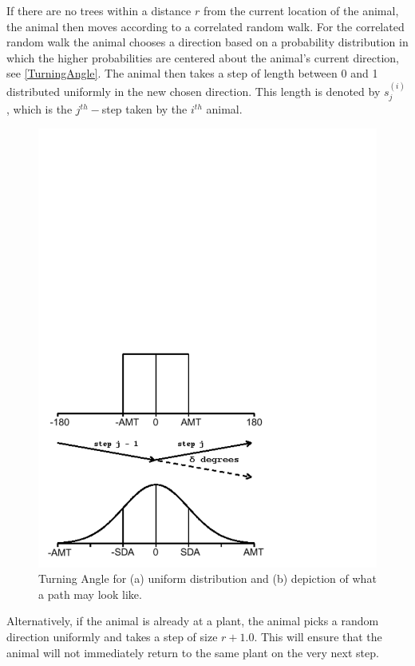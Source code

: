   If there are no trees within a distance $r$ from the current location of the animal, the animal then
  moves according to a correlated random walk.  For the correlated random walk the animal chooses a
  direction based on a probability distribution in which the higher probabilities are centered about
  the animal's current direction, see \autoref{TurningAngle}.  The animal then takes a step of
  length between 0 and 1 distributed uniformly in the new chosen direction.  This length is denoted by
  $s_j^{(i)}$, which is the $j^{th}-$step taken by the $i^{th}$ animal.
  \begin{figure}[H]\label{TurningAngle}
    \begin{center}
    \includegraphics[scale=0.5,trim=0 30 150 510]{TADistribution.pdf}
    \end{center}
    \caption{Turning Angle for (a) uniform distribution and (b) depiction
    of what a path may look like.}
  \end{figure}

  Alternatively, if the animal is already at a plant, the animal picks a random direction uniformly
  and takes a step of size $r+1.0$.  This will ensure that the animal will not immediately return to
  the same plant on the very next step.


